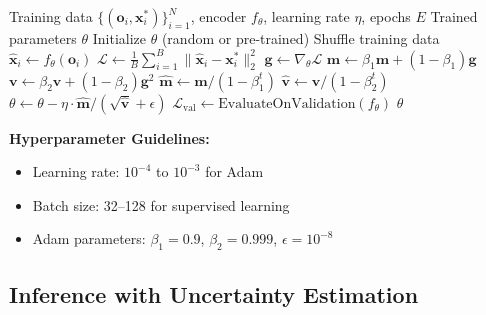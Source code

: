\begin{algorithm}[H]
\caption{Supervised Encoder Training}
\label{alg:supervised_training}
\begin{algorithmic}[1]
\REQUIRE Training data $\{(\mathbf{o}_i, \mathbf{x}_i^*)\}_{i=1}^N$, encoder $f_\theta$, learning rate $\eta$, epochs $E$
\ENSURE Trained parameters $\theta$
\STATE Initialize $\theta$ (random or pre-trained)
\STATE
{}
    \STATE Shuffle training data
        \STATE {}
            \STATE $\hat{\mathbf{x}}_i \gets f_\theta(\mathbf{o}_i)$
        \ENDFOR
        \STATE
        \STATE {}
        \STATE $\mathcal{L} \gets \frac{1}{B} \sum_{i=1}^B \|\hat{\mathbf{x}}_i - \mathbf{x}_i^*\|_2^2$
        \STATE
        \STATE {}
        \STATE $\mathbf{g} \gets \nabla_\theta \mathcal{L}$
        \STATE
        \STATE {}
        \STATE $\mathbf{m} \gets \beta_1 \mathbf{m} + (1 - \beta_1) \mathbf{g}$
        \STATE $\mathbf{v} \gets \beta_2 \mathbf{v} + (1 - \beta_2) \mathbf{g}^2$
        \STATE $\hat{\mathbf{m}} \gets \mathbf{m} / (1 - \beta_1^t)$ 
        \STATE $\hat{\mathbf{v}} \gets \mathbf{v} / (1 - \beta_2^t)$
        \STATE $\theta \gets \theta - \eta \cdot \hat{\mathbf{m}} / (\sqrt{\hat{\mathbf{v}}} + \epsilon)$
    \ENDFOR
    \STATE
    \STATE {}
    \STATE $\mathcal{L}_{\text{val}} \gets \text{EvaluateOnValidation}(f_\theta)$
    \STATE {}
\ENDFOR
\RETURN $\theta$
\end{algorithmic}
\end{algorithm}

\textbf{Hyperparameter Guidelines:}
\begin{itemize}
    \item Learning rate: $10^{-4}$ to $10^{-3}$ for Adam
    \item Batch size: 32--128 for supervised learning
    \item Adam parameters: $\beta_1 = 0.9$, $\beta_2 = 0.999$, $\epsilon = 10^{-8}$
\end{itemize}

\subsection{Inference with Uncertainty Estimation}


